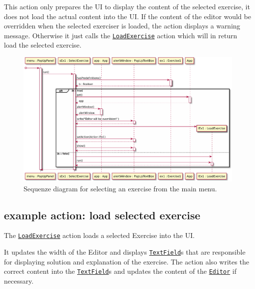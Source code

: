 This action only prepares the UI to display the content of the selected exercise, 
it does not load the actual content into the UI. If the content of the editor would 
be overridden when the selected exerciser is loaded, the action displays a warning
message. Otherwise it just calls the \texttt{\hyperref[type:edu.kit.wavelength.client.view.action.LoadExercise]{LoadExercise}} 
action which will in return load the selected exercise.

\begin{figure}[H]
	\centering
	\includegraphics[width=\textwidth]{sequenceDiagrams/selectExercise}
	\caption{Sequenze diagram for selecting an exercise from the main menu.}
\end{figure}

\subsection{example action: load selected exercise}
The \texttt{\hyperref[type:edu.kit.wavelength.client.view.action.LoadExercise]{LoadExercise}} 
action loads a selected Exercise into the UI.

It updates the width of the Editor and displays \texttt{\hyperref[type:edu.kit.wavelength.client.view.webui.component.TextField]{TextField}}s 
that are responsible for displaying solution and explanation of the exercise.
The action also writes the correct content into the \texttt{\hyperref[type:edu.kit.wavelength.client.view.webui.component.TextField]{TextField}}s and updates the content of the \texttt{\hyperref[type:edu.kit.wavelength.client.view.webui.component.Editor]{Editor}} if necessary.

